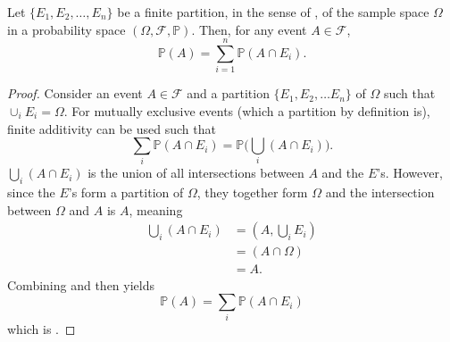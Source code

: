 \begin{theorem}
	\label{theorem:law_of_total_probability}
	Let $\{E_1, E_2, \dots, E_n\}$ be a finite partition, in the sense of , of the sample space $\Omega$ in a probability space $(\Omega, \mathcal{F}, \mathbb{P})$. Then, for any event $A \in \mathcal{F}$,
	\begin{equation}
		\mathbb{P}(A) = \sum_{i=1}^n \mathbb{P}(A \cap E_i).
		\label{eq:law_total_probability}
	\end{equation}
\end{theorem}

\begin{proof}
	Consider an event $A\in \mathcal{F}$ and a partition $\{E_1,E_2,\dots E_n\}$ of $\Omega$ such that $\cup_{i}E_i=\Omega$. For mutually exclusive events (which a partition by definition is), finite additivity can be used such that
	\begin{equation}
		\sum_{i}\mathbb{P}(A \cap E_i) = \mathbb{P}\bigg(\bigcup_{i}(A \cap E_i)\bigg).
		\label{eq:qq1}
	\end{equation} 
	$\bigcup_{i}(A \cap E_i)$ is the union of all intersections between $A$ and the $E$'s. However, since the $E$'s form a partition of $\Omega$, they together form $\Omega$ and the intersection between $\Omega$ and $A$ is $A$, meaning
	\begin{equation}
		\begin{split}
			\bigcup_{i}(A \cap E_i)  &= (A,\bigcup_{i}E_i)\\
			&= (A \cap \Omega)\\
			& =A.
		\end{split}
		\label{eq:qq2}
	\end{equation}
	Combining  and  then yields
	\begin{equation}
		\mathbb{P}(A) = \sum_{i} \mathbb{P}(A \cap E_i)
	\end{equation}
	which is .
\end{proof}


